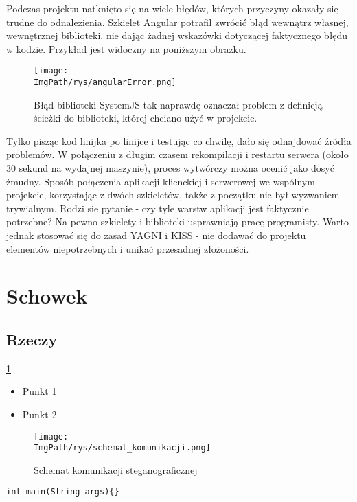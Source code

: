 \documentclass[a4paper,12pt,twoside,openany]{report}
\newcommand{\ImgPath}{.}
\begin{document}
Podczas projektu natknięto się na wiele błędów, których przyczyny okazały się trudne do odnalezienia. Szkielet Angular potrafił zwrócić błąd wewnątrz własnej, wewnętrznej biblioteki, nie dając żadnej wskazówki dotyczącej faktycznego błędu w kodzie. Przykład jest widoczny na poniższym obrazku.
				\begin{figure}[!htbp]
					\begin{center}
						\centering
						\texttt{[image: \\ImgPath/rys/angularError.png]}
					\end{center}
					\caption{Błąd biblioteki SystemJS tak naprawdę oznaczał problem z definicją ścieżki do biblioteki, której chciano użyć w projekcie.}
					\label{UMLTS}
				\end{figure}
Tylko pisząc kod linijka po linijce i testując co chwilę, dało się odnajdować źródła problemów. W połączeniu z długim czasem rekompilacji i restartu serwera (około 30 sekund na wydajnej maszynie), proces wytwórczy można ocenić jako dosyć żmudny. Sposób połączenia aplikacji klienckiej i serwerowej we wspólnym projekcie, korzystając z dwóch szkieletów, także z początku nie był wyzwaniem trywialnym. Rodzi sie pytanie - czy tyle warstw aplikacji jest faktycznie potrzebne? Na pewno szkielety i biblioteki usprawniają pracę programisty. Warto jednak stosować się do zasad YAGNI i KISS - nie dodawać do projektu elementów niepotrzebnych i unikać przesadnej złożoności.
\chapter{Schowek}
\label{Schowek}

\section{Rzeczy}
\ref{Schowek}
\cite{Stevens}
\begin{itemize}
	\item Punkt 1
	\item Punkt 2
\end{itemize}
\begin{figure}[!htbp]
	\begin{center}
		\centering
		\texttt{[image: \\ImgPath/rys/schemat\_komunikacji.png]}
	\end{center}
	\caption{Schemat komunikacji steganograficznej}
	\label{schematKomunikacji}
\end{figure}
\begin{lstlisting}
int main(String args){}
\end{lstlisting}
\end{document}

